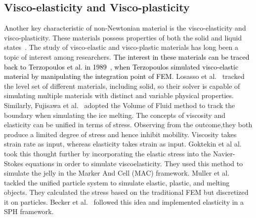 \documentclass[10pt,journal,compsoc]{IEEEtran}
\newcommand{\revised}[1]{{\textcolor{black}{#1}}}
\begin{document}
\subsection{Visco-elasticity and Visco-plasticity}
Another key characteristic of non-Newtonian material is the visco-elasticity and visco-plasticity. These materials possess properties of both the solid and liquid states~\cite{gao2021simulating}. The study of visco-elastic and visco-plastic materials has long been a topic of interest among researchers. \revised{The interest in these materials can be traced back to Terzopoulos et al. in 1989~\cite{Terzopoulos1989}, when Terzopoulos simulated visco-elastic material by manipulating the integration point of FEM.} Losasso et al.~\cite{Losasso2006} tracked the level set of different materials, including solid, so their solver is capable of simulating multiple materials with distinct and variable physical properties. Similarly, Fujisawa et al.~\cite{Fujisawa2007} adopted the Volume of Fluid method to track the boundary when simulating the ice melting. The concepts of viscosity and elasticity can be unified in terms of stress. Observing from the outcome,they both produce a limited degree of stress and hence inhibit mobility. Viscosity takes strain rate as input, whereas elasticity takes strain as input. Goktekin et al al.~\cite{Goktekin2004} took this thought further by incorporating the elastic stress into the Navier-Stokes equations in order to simulate viscoelasticity. They used this method to simulate the jelly in the Marker And Cell (MAC) framework. Muller et al.~\cite{Muller2004-elastic-plastic-melting} tackled the unified particle system to simulate elastic, plastic, and melting objects. They calculated the stress based on the traditional FEM but discretized it on particles. Becker et al.~\cite{Becker2009} followed this idea and implemented elasticity in a SPH framework.
\end{document}
